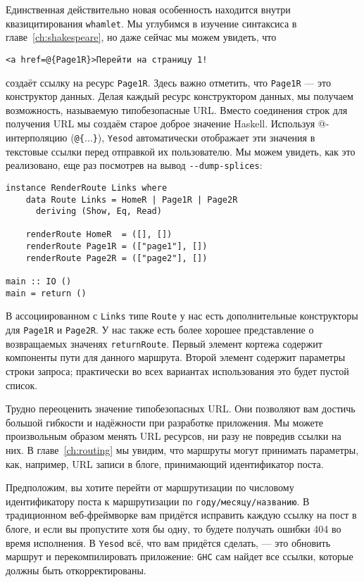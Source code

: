 Единственная действительно новая особенность находится внутри квазицитирования
\lstinline'whamlet'. Мы углубимся в изучение синтаксиса в главе~\ref{ch:shakespeare}, но
даже сейчас мы можем увидеть, что

\begin{lstlisting}
<a href=@{Page1R}>Перейти на страницу 1!
\end{lstlisting}

создаёт ссылку на ресурс \lstinline!Page1R!. Здесь важно отметить, что \lstinline!Page1R!
--- это конструктор данных. Делая каждый ресурс конструктором данных, мы получаем
возможность, называемую типобезопасные URL. Вместо соединения строк для получения URL мы
создаём старое доброе значение Haskell. Используя @-интерполяцию (\texttt{@\{$\ldots$\}}),
\texttt{Yesod} автоматически отображает эти значения в текстовые ссылки перед отправкой их
пользователю. Мы можем увидеть, как это реализовано, еще раз посмотрев на вывод
\lstinline!--dump-splices!:

\begin{lstlisting}
instance RenderRoute Links where
    data Route Links = HomeR | Page1R | Page2R
      deriving (Show, Eq, Read)

    renderRoute HomeR  = ([], [])
    renderRoute Page1R = (["page1"], [])
    renderRoute Page2R = (["page2"], [])

main :: IO ()
main = return ()
\end{lstlisting}

В ассоциированном с \lstinline!Links! типе \lstinline!Route! у нас есть дополнительные
конструкторы для \lstinline!Page1R! и \lstinline!Page2R!. У нас также есть более хорошее
представление о возвращаемых значенях \lstinline!returnRoute!. Первый элемент кортежа
содержит компоненты пути для данного маршрута. Второй элемент содержит параметры строки
запроса; практически во всех вариантах использования это будет пустой список.

Трудно переоценить значение типобезопасных URL. Они позволяют вам достичь большой гибкости
и надёжности при разработке приложения. Мы можете произвольным образом менять URL
ресурсов, ни разу не повредив ссылки на них. В главе~\ref{ch:routing} мы увидим, что
маршруты могут принимать параметры, как, например, URL записи в блоге, принимающий
идентификатор поста.

Предположим, вы хотите перейти от маршрутизации по числовому идентификатору поста к
маршрутизации по \texttt{году/месяцу/названию}. В традиционном веб-фреймворке вам придётся
исправить каждую ссылку на пост в блоге, и если вы пропустите хотя бы одну, то будете
получать ошибки 404 во время исполнения. В \texttt{Yesod} всё, что вам придётся сделать,
--- это обновить маршрут и перекомпилировать приложение: \texttt{GHC} сам найдет все
ссылки, которые должны быть откорректированы.

